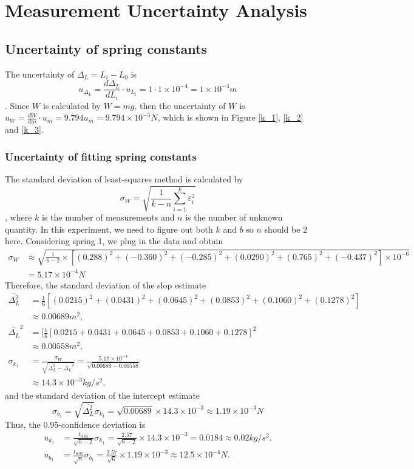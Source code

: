 \section{Measurement Uncertainty Analysis}
\subsection{Uncertainty of spring constants}
    The uncertainty of $\Delta_L=L_i-L_0$ is 
    \[
        u_{\Delta_L}=\frac{d\Delta_L}{dL_i}\cdot u_{L_i}=1\cdot 1\times10^{-4}=1\times10^{-4}m
    \].
    Since $W$ is calculated by $W=mg$, then the uncertainty of $W$ is $u_{W}=\frac{dW}{dm}\cdot u_m=9.794u_m=9.794\times10^{-5}N$, which is shown in Figure \ref{k_1}, \ref{k_2} and \ref{k_3}.
\subsubsection{Uncertainty of fitting spring constants}
    The standard deviation of least-squares method is calculated by
    \[
        \sigma_W=\sqrt{\frac{1}{k-n}\sum_{i=1}^{k}\varepsilon_i^2}
    \],
    where $k$ is the number of measurements and $n$ is the number of unknown quantity. In this experiment, we need to figure out both $k$ and $b$ so $n$ should be 2 here. Considering spring 1, we plug in the data and obtain
    \[
    \begin{split}
        \sigma_W&\approx \sqrt{\frac{1}{6-2}\times [(0.288)^2+(-0.360)^2+(-0.285)^2+(0.0290)^2+(0.765)^2+(-0.437)^2]\times 10^{-6}}\\
        &=5.17\times10^{-4} N
    \end{split}
    \]
    Therefore, the standard deviation of the slop estimate
    \[
    \begin{split}
        \overline{\Delta_L^2}&=\frac{1}{6}[(0.0215)^2+(0.0431)^2+(0.0645)^2+(0.0853)^2+(0.1060)^2+(0.1278)^2]\\[0.2cm]
        &\approx 0.00689 m^2,\\[0.4cm]
        \overline{\Delta_L}^2&=[\frac{1}{6}[0.0215+0.0431+0.0645+0.0853+0.1060+0.1278]^2\\[0.2cm]
        &\approx 0.00558 m^2,\\[0.4cm]
        \sigma_{k_1}&=\frac{\sigma_W}{\sqrt{\overline{\Delta_L^2}-\overline{\Delta_L}^2}}=\frac{5.17\times10^{-4}}{\sqrt{0.00689-0.00558}}\\[0.2cm]
        &\approx14.3\times10^{-3} kg/s^2,
    \end{split}
    \]
    and the standard deviation of the intercept estimate
    \[
        \sigma_{b_1}=\sqrt{\overline{\Delta_L^2}}\sigma_{k_1}=\sqrt{0.00689}\times14.3\times10^{-3}\approx1.19\times10^{-3}N
    \]
    Thus, the 0.95-confidence deviation is 
    \[
    \begin{split}
        u_{k_1}&=\frac{t_{0.95}}{\sqrt{n-2}}\sigma_{k_1}=\frac{2.57}{\sqrt{6-2}}\times14.3\times10^{-3}= 0.0184\approx 0.02kg/s^2.\\[0.4cm]
        u_{b_1}&=\frac{t_0.95}{\sqrt{n}}\sigma_{b_1}=\frac{2.57}{\sqrt{6}}\times1.19\times10^{-3}\approx12.5\times10^{-4}N.
    \end{split}
    \]
    
